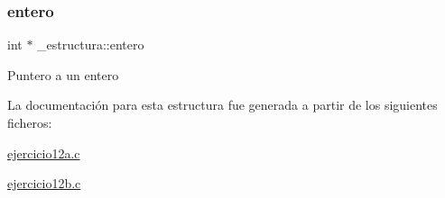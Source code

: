 \subsubsection{\texorpdfstring{entero}{entero}}
{\footnotesize\ttfamily int $\ast$ \+\_\+estructura\+::entero}

Puntero a un entero 

La documentación para esta estructura fue generada a partir de los siguientes ficheros\+:\begin{DoxyCompactItemize}
\item 
\mbox{\hyperlink{ejercicio12a_8c}{ejercicio12a.\+c}}\item 
\mbox{\hyperlink{ejercicio12b_8c}{ejercicio12b.\+c}}\end{DoxyCompactItemize}
